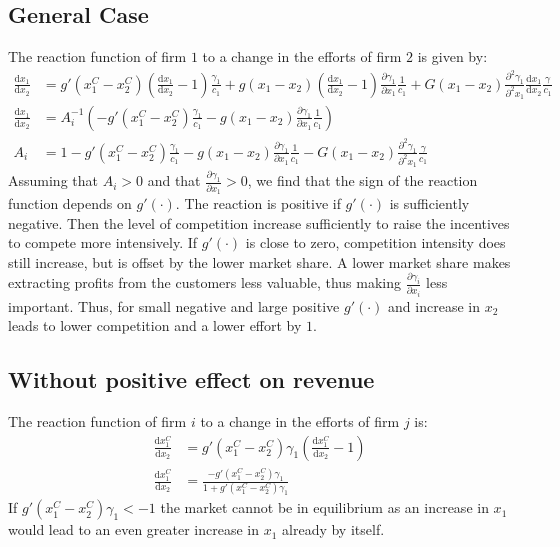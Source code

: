 \documentclass[a4paper, 11pt]{article}
\renewcommand{\d}{\text{d}}
\begin{document}
\subsection{General Case}
The reaction function of firm $1$ to a change in the efforts of firm $2$ is given by:
\begin{align}
\frac{\d x_1}{\d x_2} &= g'(x_1^C-x_2^C)\left(\frac{\d x_1}{\d x_2}-1\right)\frac{\gamma_1}{c_1} + g(x_1-x_2)\left(\frac{\d x_1}{\d x_2}-1\right)\frac{\partial \gamma_1}{\partial x_1}\frac{1}{c_1} + G(x_1-x_2)\frac{\partial^2 \gamma_1}{\partial^2 x_1}\frac{\d x_1}{\d x_2}\frac{\gamma}{c_1}\\
\frac{\d x_1}{\d x_2} &= A_i^{-1} \left(-g'(x_1^C-x_2^C)\frac{\gamma_1}{c_1} - g(x_1-x_2)\frac{\partial \gamma_1}{\partial x_1}\frac{1}{c_1}\right)\\
A_i &= 1 - g'(x_1^C-x_2^C)\frac{\gamma_1}{c_1}-g(x_1-x_2)\frac{\partial \gamma_1}{\partial x_1}\frac{1}{c_1}-G(x_1-x_2)\frac{\partial^2 \gamma_1}{\partial^2 x_1}\frac{\gamma}{c_1}
\end{align}
Assuming that $A_i>0$ and that $\frac{\partial \gamma_1}{\partial x_1}>0$, we find that the sign of the reaction function depends on $g'(\cdot)$. The reaction is positive if $g'(\cdot)$ is sufficiently negative. Then the level of competition increase sufficiently to raise the incentives to compete more intensively. If $g'(\cdot)$ is close to zero, competition intensity does still increase, but is offset by the lower market share. A lower market share makes extracting profits from the customers less valuable, thus making $\frac{\partial \gamma_i}{\partial x_i}$ less important. Thus, for small negative and large positive $g'(\cdot)$ and increase in $x_2$ leads to lower competition and a lower effort by $1$. 

\subsection{Without positive effect on revenue}
The reaction function of firm $i$ to a change in the efforts of firm $j$ is:
\begin{align}
\frac{\d x_1^C}{\d x_2} &= g'(x_1^C-x_2^C)\gamma_1\left(\frac{\d x_1^C}{\d x_2}-1\right)\\
\frac{\d x_1^C}{\d x_2} &= \frac{-g'(x_1^C-x_2^C)\gamma_1}{1+g'(x_1^C-x_2^C)\gamma_1}
\end{align}
If $g'(x_1^C-x_2^C)\gamma_1<-1$ the market cannot be in equilibrium as an increase in $x_1$ would lead to an even greater increase in $x_1$ already by itself.
\end{document}
